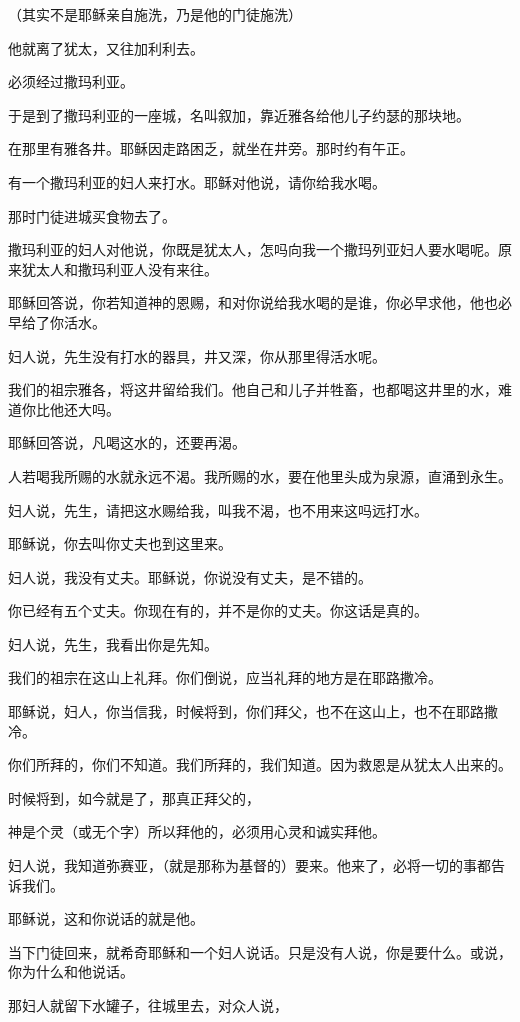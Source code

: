 \documentclass[12pt,oneside]{book}
\begin{document}
（其实不是耶稣亲自施洗，乃是他的门徒施洗）

他就离了犹太，又往加利利去。

必须经过撒玛利亚。

于是到了撒玛利亚的一座城，名叫叙加，靠近雅各给他儿子约瑟的那块地。

在那里有雅各井。耶稣因走路困乏，就坐在井旁。那时约有午正。

有一个撒玛利亚的妇人来打水。耶稣对他说，请你给我水喝。

那时门徒进城买食物去了。

撒玛利亚的妇人对他说，你既是犹太人，怎吗向我一个撒玛列亚妇人要水喝呢。原来犹太人和撒玛利亚人没有来往。

耶稣回答说，你若知道神的恩赐，和对你说给我水喝的是谁，你必早求他，他也必早给了你活水。

妇人说，先生没有打水的器具，井又深，你从那里得活水呢。

我们的祖宗雅各，将这井留给我们。他自己和儿子并牲畜，也都喝这井里的水，难道你比他还大吗。

耶稣回答说，凡喝这水的，还要再渴。

人若喝我所赐的水就永远不渴。我所赐的水，要在他里头成为泉源，直涌到永生。

妇人说，先生，请把这水赐给我，叫我不渴，也不用来这吗远打水。

耶稣说，你去叫你丈夫也到这里来。

妇人说，我没有丈夫。耶稣说，你说没有丈夫，是不错的。

你已经有五个丈夫。你现在有的，并不是你的丈夫。你这话是真的。

妇人说，先生，我看出你是先知。

我们的祖宗在这山上礼拜。你们倒说，应当礼拜的地方是在耶路撒冷。

耶稣说，妇人，你当信我，时候将到，你们拜父，也不在这山上，也不在耶路撒冷。

你们所拜的，你们不知道。我们所拜的，我们知道。因为救恩是从犹太人出来的。

时候将到，如今就是了，那真正拜父的，

神是个灵（或无个字）所以拜他的，必须用心灵和诚实拜他。

妇人说，我知道弥赛亚，（就是那称为基督的）要来。他来了，必将一切的事都告诉我们。

耶稣说，这和你说话的就是他。

当下门徒回来，就希奇耶稣和一个妇人说话。只是没有人说，你是要什么。或说，你为什么和他说话。

那妇人就留下水罐子，往城里去，对众人说，
\end{document}
